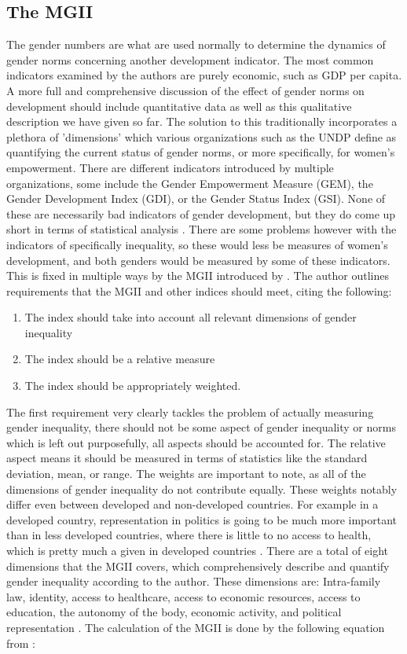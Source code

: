 \documentclass[12pt, letterpaper]{article}
\begin{document}
\subsection{The MGII}
The gender numbers are what are used normally to determine the dynamics of gender norms concerning another development indicator. The most common indicators examined by the authors are purely economic, such as GDP per capita. A more full and comprehensive discussion of the effect of gender norms on development should include quantitative data as well as this qualitative description we have given so far. The solution to this traditionally incorporates a plethora of 'dimensions' which various organizations such as the UNDP define as quantifying the current status of gender norms, or more specifically, for women's empowerment. There are different indicators introduced by multiple organizations, some include the Gender Empowerment Measure (GEM), the Gender Development Index (GDI), or the Gender Status Index (GSI). None of these are necessarily bad indicators of gender development, but they do come up short in terms of statistical analysis \cite{ferrant2}. There are some problems however with the indicators of specifically inequality, so these would less be measures of women's development, and both genders would be measured by some of these indicators. This is fixed in multiple ways by the MGII introduced by \cite{ferrant2}. The author outlines requirements that the MGII and other indices should meet, citing the following:
\begin{enumerate}
\item The index should take into account all relevant dimensions of gender inequality
\item The index should be a relative measure
\item The index should be appropriately weighted. 
\end{enumerate}
The first requirement very clearly tackles the problem of actually measuring gender inequality, there should not be some aspect of gender inequality or norms which is left out purposefully, all aspects should be accounted for. The relative aspect means it should be measured in terms of statistics like the standard deviation, mean, or range. The weights are important to note, as all of the dimensions of gender inequality do not contribute equally. These weights notably differ even between developed and non-developed countries. For example in a developed country, representation in politics is going to be much more important than in less developed countries, where there is little to no access to health, which is pretty much a given in developed countries \footnotemark[2]. There are a total of eight dimensions that the MGII covers, which comprehensively describe and quantify gender inequality according to the author. These dimensions are: Intra-family law, identity, access to healthcare, access to economic resources, access to education, the autonomy of the body, economic activity, and political representation \cite{ferrant2}. The calculation of the MGII is done by the following equation from \cite{ferrant}:
\end{document}
